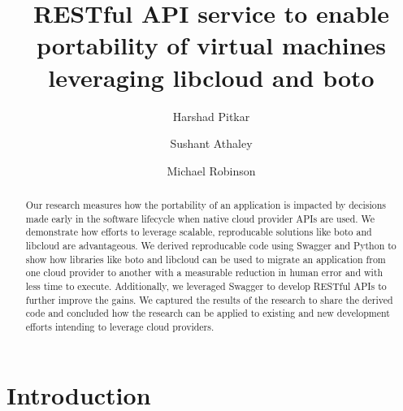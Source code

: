 % 
\title{RESTful API service to enable portability of virtual machines leveraging libcloud and boto}


\author{Harshad Pitkar}

\author{Sushant Athaley}

\author{Michael Robinson}


\renewcommand{\shortauthors}{H. Pitkar, S. Athaley, M. Robinson}


\begin{abstract}
Our research measures how the portability of an application is impacted by decisions 
made early in the software lifecycle when native cloud provider APIs are used. We  
demonstrate how efforts to leverage scalable, reproducable solutions like boto and 
libcloud are advantageous. We derived reproducable code using Swagger and Python
to show how libraries like boto and libcloud can be used to migrate an application from 
one cloud provider to another with a measurable reduction in human error and with less 
time to execute. Additionally, we leveraged Swagger to develop RESTful APIs to 
further improve the gains. We captured the results of the research to share the derived 
code and concluded how the research can be applied to existing and new development efforts 
intending to leverage cloud providers. 
\end{abstract}



\maketitle

\section{Introduction}\label{introduction}

